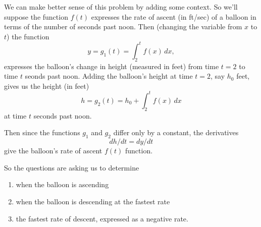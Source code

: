 \documentclass{ximera}
\begin{document}
\begin{question}
\begin{explanation}
We can make better sense of this problem by adding some context. So we'll suppose the function $f(t)$ expresses the rate of ascent (in ft/sec) of a balloon in terms of the number of seconds past noon. Then (changing the variable from $x$ to $t$) the function 
\[
  y = g_1(t) = \int_2^t f(x)\, dx ,
\]
expresses the balloon's change in height (measured in feet) from time $t=2$ to time $t$ seonds past noon. Adding the balloon's height at time $t=2$, say $h_0$ feet, gives us the height (in feet)
\[
 h = g_2(t) = h_0 + \int_2^t f(x)\, dx
\]
at time $t$ seconds past noon.

Then since the functions $g_1$ and $g_2$ differ only by a constant, the derivatives 
\[
dh/dt = dy/dt 
\]
give the balloon's rate of ascent $f(t)$ function. 

So the questions are asking us to determine
\begin{enumerate}
\item when the balloon is ascending

\item when the balloon is descending at the fastest rate

\item the fastest rate of descent, expressed as a negative rate.


\end{enumerate}

\end{explanation}




\end{question}
\end{document}
